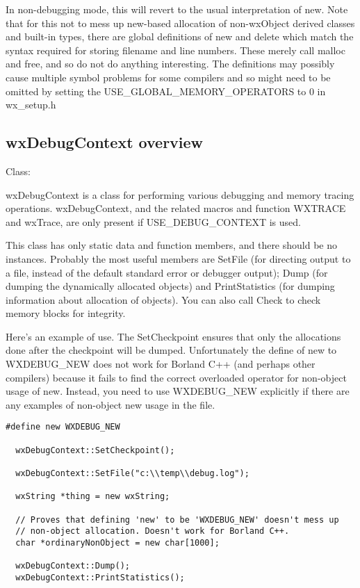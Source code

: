 In non-debugging mode, this will revert to the usual interpretation
of new. Note that for this not to mess up new-based allocation of non-wxObject derived classes and
built-in types, there are global definitions of new and delete which match
the syntax required for storing filename and line numbers. These merely
call malloc and free, and so do not do anything interesting. The definitions
may possibly cause multiple symbol problems for some compilers and so might
need to be omitted by setting the USE\_GLOBAL\_MEMORY\_OPERATORS to 0 in wx\_setup.h

\subsection{wxDebugContext overview}\label{wxdebugcontextoverview}


Class: 

wxDebugContext is a class for performing various debugging and memory tracing
operations. wxDebugContext, and the related macros and function WXTRACE and
wxTrace, are only present if USE\_DEBUG\_CONTEXT is used.

This class has only static data and function members, and there should be
no instances. Probably the most useful members are SetFile (for directing output
to a file, instead of the default standard error or debugger output);
Dump (for dumping the dynamically allocated objects) and PrintStatistics
(for dumping information about allocation of objects). You can also call
Check to check memory blocks for integrity.

Here's an example of use. The SetCheckpoint ensures that only the
allocations done after the checkpoint will be dumped. Unfortunately
the define of new to WXDEBUG\_NEW does not work for Borland C++ (and
perhaps other compilers) because it fails to find the correct overloaded
operator for non-object usage of new. Instead, you need to use WXDEBUG\_NEW
explicitly if there are any examples of non-object new usage in the file.

\begin{verbatim}
#define new WXDEBUG_NEW

  wxDebugContext::SetCheckpoint();

  wxDebugContext::SetFile("c:\\temp\\debug.log");

  wxString *thing = new wxString;

  // Proves that defining 'new' to be 'WXDEBUG_NEW' doesn't mess up
  // non-object allocation. Doesn't work for Borland C++.
  char *ordinaryNonObject = new char[1000];

  wxDebugContext::Dump();
  wxDebugContext::PrintStatistics();
\end{verbatim}

